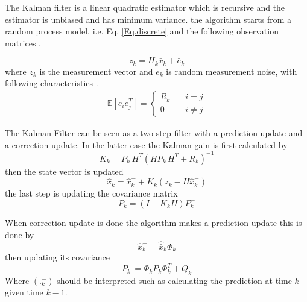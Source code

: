The Kalman filter is a linear quadratic estimator which is recursive and the estimator is unbiased and has minimum variance. the algorithm starts from a random process model, i.e. Eq. \eqref{Eq.discrete} and the following observation matrices \cite{Discrete_kalman}.

\begin{equation}
z_k = H_k\bar{x}_k + \bar{e}_k
\end{equation}
where $z_k$ is the measurement vector and $e_k$ is random measurement noise, with following characteristics \cite{signal_process}.
\begin{align}
\mathbb{E}[\bar{e_i}\bar{e}_j^T] =
\begin{cases}
  R_k &\quad i=j\\    
  0 &\quad i\neq j   
\end{cases}
\end{align}

The Kalman Filter can be seen as a two step filter with a prediction update and a correction update. In the latter case the Kalman gain is first calculated by
\begin{equation}
K_k = P_k^-H^T(HP_k^-H^T+R_k)^{-1}
\end{equation}
then the state vector is updated
\begin{equation}
\hat{x}_k = \hat{x}_k^- + K_k(z_k-H\hat{x}_k^-)
\end{equation}
the last step is updating the covariance matrix
\begin{equation}
P_k = (I-K_kH)P_k^-
\end{equation}

When correction update is done the algorithm makes a prediction update this is done by 
\begin{equation}
\hat{x}_k^- = \hat{\bar{x}}_k\Phi_k
\end{equation}
then updating its covariance
\begin{equation}
P_k^- = \Phi_k P_k \Phi_k^T + Q_k^.
\end{equation}
Where $(._k^-)$ should be interpreted such as calculating the prediction at time $k$ given time $k-1$.\\

